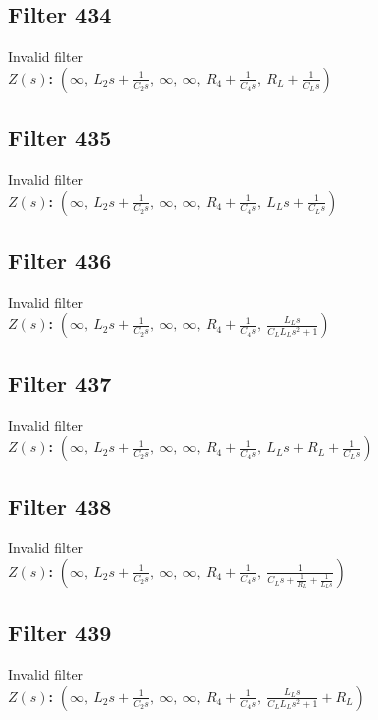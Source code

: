 \documentclass{article}
\begin{document}
\subsection*{Filter 434}
Invalid filter \\ 
\textbf{$Z(s)$:} $\left( \infty, \  L_{2} s + \frac{1}{C_{2} s}, \  \infty, \  \infty, \  R_{4} + \frac{1}{C_{4} s}, \  R_{L} + \frac{1}{C_{L} s}\right)$ \\ 
\subsection*{Filter 435}
Invalid filter \\ 
\textbf{$Z(s)$:} $\left( \infty, \  L_{2} s + \frac{1}{C_{2} s}, \  \infty, \  \infty, \  R_{4} + \frac{1}{C_{4} s}, \  L_{L} s + \frac{1}{C_{L} s}\right)$ \\ 
\subsection*{Filter 436}
Invalid filter \\ 
\textbf{$Z(s)$:} $\left( \infty, \  L_{2} s + \frac{1}{C_{2} s}, \  \infty, \  \infty, \  R_{4} + \frac{1}{C_{4} s}, \  \frac{L_{L} s}{C_{L} L_{L} s^{2} + 1}\right)$ \\ 
\subsection*{Filter 437}
Invalid filter \\ 
\textbf{$Z(s)$:} $\left( \infty, \  L_{2} s + \frac{1}{C_{2} s}, \  \infty, \  \infty, \  R_{4} + \frac{1}{C_{4} s}, \  L_{L} s + R_{L} + \frac{1}{C_{L} s}\right)$ \\ 
\subsection*{Filter 438}
Invalid filter \\ 
\textbf{$Z(s)$:} $\left( \infty, \  L_{2} s + \frac{1}{C_{2} s}, \  \infty, \  \infty, \  R_{4} + \frac{1}{C_{4} s}, \  \frac{1}{C_{L} s + \frac{1}{R_{L}} + \frac{1}{L_{L} s}}\right)$ \\ 
\subsection*{Filter 439}
Invalid filter \\ 
\textbf{$Z(s)$:} $\left( \infty, \  L_{2} s + \frac{1}{C_{2} s}, \  \infty, \  \infty, \  R_{4} + \frac{1}{C_{4} s}, \  \frac{L_{L} s}{C_{L} L_{L} s^{2} + 1} + R_{L}\right)$ \\ 
\end{document}
